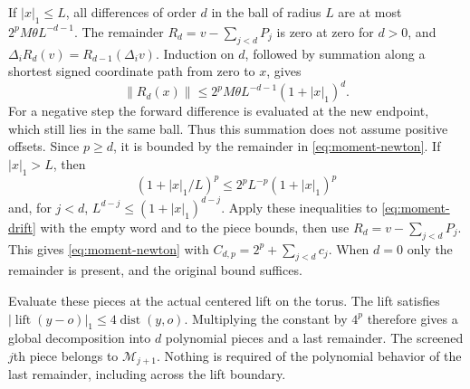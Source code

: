If $|x|_1\le L$, all differences of order $d$ in the ball of
radius $L$ are at most $2^pM\theta L^{-d-1}$. The remainder
$R_d=v-\sum_{j<d}P_j$ is zero at zero for $d>0$, and
$\Delta_iR_d(v)=R_{d-1}(\Delta_i v)$. Induction on $d$,
followed by summation along a shortest signed coordinate path
from zero to $x$, gives
\[
 \|R_d(x)\|\le2^pM\theta L^{-d-1}(1+|x|_1)^d.
\]
For a negative step the forward difference is evaluated at the
new endpoint, which still lies in the same ball. Thus this
summation does not assume positive offsets. Since $p\ge d$,
it is bounded by the remainder in \eqref{eq:moment-newton}.
If $|x|_1>L$, then
\[
 (1+|x|_1/L)^p\le2^p L^{-p}(1+|x|_1)^p
\]
and, for $j<d$,
$L^{d-j}\le(1+|x|_1)^{d-j}$. Apply these inequalities to
\eqref{eq:moment-drift} with the empty word and to the piece
bounds, then use $R_d=v-\sum_{j<d}P_j$. This gives
\eqref{eq:moment-newton} with
$C_{d,p}=2^p+\sum_{j<d}c_j$. When $d=0$ only the remainder
is present, and the original bound suffices.

Evaluate these pieces at the actual centered lift on the torus.
The lift satisfies $|\operatorname{lift}(y-o)|_1\le
4\operatorname{dist}(y,o)$. Multiplying the constant by $4^p$
therefore gives a global decomposition into $d$ polynomial
pieces and a last remainder. The screened $j$th piece belongs
to $\mathcal M_{j+1}$. Nothing is required of the polynomial
behavior of the last remainder, including across the lift boundary.

